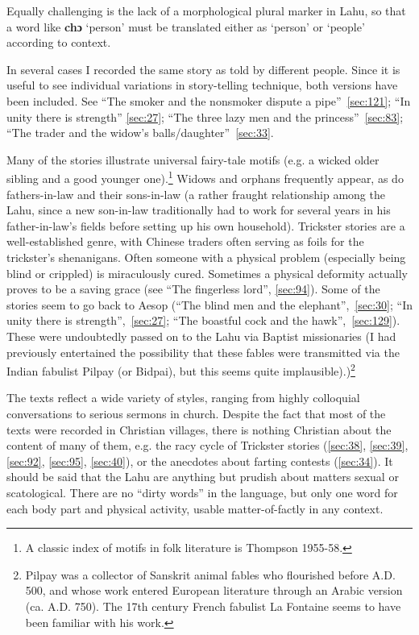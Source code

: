 Equally challenging is the lack of a morphological plural marker in
Lahu, so that a word like \textbf{chɔ} `person' must be translated
either as `person' or `people' according to context.

In several cases I recorded the same story as told by different people.
Since it is useful to see individual variations in story-telling
technique, both versions have been included. See ``The smoker and the
nonsmoker dispute a pipe''~\ref{sec:121}; ``In unity there is strength'' \ref{sec:27};
``The three lazy men and the princess''~\ref{sec:83}; ``The trader and the
widow's balls/daughter''~\ref{sec:33}.

Many of the stories illustrate universal fairy-tale motifs (e.g. a
wicked older sibling and a good younger one).\footnote{A classic index
  of motifs in folk literature is Thompson 1955-58.} Widows and
orphans frequently appear, as do fathers-in-law and their sons-in-law
(a rather fraught relationship among the Lahu, since a new son-in-law
traditionally had to work for several years in his father-in-law's
fields before setting up his own household). Trickster stories are a
well-established genre, with Chinese traders often serving as foils
for the trickster's shenanigans. Often someone with a physical problem
(especially being blind or crippled) is miraculously cured. Sometimes
a physical deformity actually proves to be a saving grace (see ``The
fingerless lord'', \ref{sec:94}). Some of the stories seem to go back
to Aesop (``The blind men and the elephant'',~\ref{sec:30}; ``In unity
there is strength'',~\ref{sec:27}; ``The boastful cock and the
hawk'',~\ref{sec:129}). These were undoubtedly passed on to the Lahu via Baptist
missionaries (I had previously entertained the possibility that these
fables were transmitted via the Indian fabulist Pilpay (or Bidpai),
but this seems quite implausible).)\footnote{Pilpay was a collector of
  Sanskrit animal fables who flourished before A.D. 500, and whose
  work entered European literature through an Arabic version
  (ca. A.D. 750). The 17th century French fabulist La Fontaine seems
  to have been familiar with his work.}


The texts reflect a wide variety of
styles, ranging from highly colloquial conversations to serious
sermons in church. Despite the fact that most of the texts were
recorded in Christian villages, there is nothing Christian about the
content of many of them, e.g. the racy cycle of Trickster stories
(\ref{sec:38}, \ref{sec:39}, \ref{sec:92}, \ref{sec:95}, \ref{sec:40}),
or the anecdotes about farting contests (\ref{sec:34}). It should be
said that the Lahu are anything but prudish about matters sexual or
scatological. There are no ``dirty words'' in the language, but only
one word for each body part and physical activity, usable
matter-of-factly in any context.

